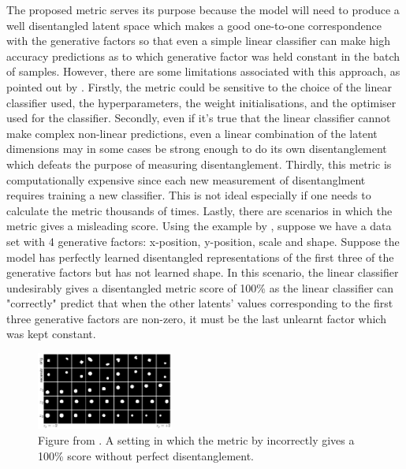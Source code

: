         The proposed metric serves its purpose because the model will need to produce a well disentangled latent space which makes a good one-to-one correspondence with the generative factors so that even a simple linear classifier can make high accuracy predictions as to which generative factor was held constant in the batch of samples. However, there are some limitations associated with this approach, as pointed out by \cite{kim2018disentangling}. Firstly, the metric could be sensitive to the choice of the linear classifier used, the hyperparameters, the weight initialisations, and the optimiser used for the classifier. Secondly, even if it's true that the linear classifier cannot make complex non-linear predictions, even a linear combination of the latent dimensions may in some cases be strong enough to do its own disentanglement which defeats the purpose of measuring disentanglement. Thirdly, this metric is computationally expensive since each new measurement of disentanglment requires training a new classifier. This is not ideal especially if one needs to calculate the metric thousands of times. Lastly, there are scenarios in which the metric gives a misleading score. Using the example by \cite{kim2018disentangling}, suppose we have a data set with 4 generative factors: x-position, y-position, scale and shape. Suppose the model has perfectly learned disentangled representations of the first three of the generative factors but has not learned shape. In this scenario, the linear classifier undesirably gives a disentangled metric score of 100\% as the linear classifier can "correctly" predict that when the other latents' values corresponding to the first three generative factors are non-zero, it must be the last unlearnt factor which was kept constant.
        
        \begin{figure}[H]
            \centering
            \includegraphics[width=0.4\textwidth]{imgs/counter_example_kim.png}
            \caption{Figure from \cite{kim2018disentangling}. A setting in which the metric by \cite{higgins2017beta} incorrectly gives a 100\% score without perfect disentanglement.}
            \label{fig:counter_example_kim}
        \end{figure}
        
